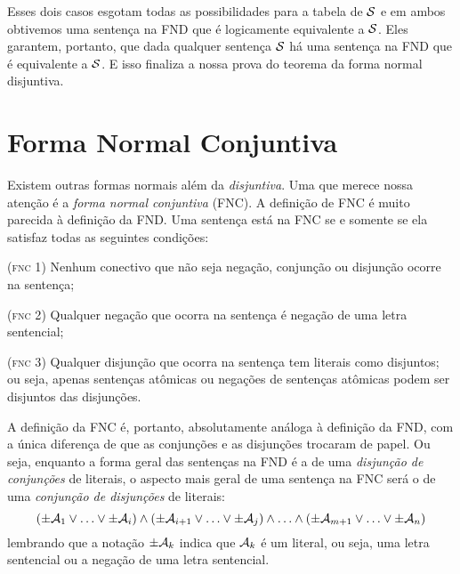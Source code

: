 	Esses dois casos esgotam todas as possibilidades para a tabela de $\mathcal{S}$ e em ambos obtivemos uma sentença na FND que é logicamente equivalente a $\mathcal{S}$.
	Eles garantem, portanto, que dada qualquer sentença $\mathcal{S}$ há uma sentença na FND que é equivalente a $\mathcal{S}$. E isso finaliza a nossa prova do teorema da forma normal disjuntiva.




\section{Forma Normal Conjuntiva}
\label{s:CNF}

Existem outras formas normais além da \emph{disjuntiva}.
Uma que merece nossa atenção é a \emph{forma normal conjuntiva} (FNC).
A definição de FNC é muito parecida à definição da FND.
Uma sentença está na FNC se e somente se ela satisfaz todas as seguintes condições:
	\begin{earg}
		\item[(\textsc{fnc 1})] Nenhum conectivo que não seja negação, conjunção ou disjunção ocorre na sentença;
		\item[(\textsc{fnc 2})] Qualquer negação que ocorra na sentença é negação de uma letra sentencial;
		\item[(\textsc{fnc 3})] Qualquer disjunção que ocorra na sentença tem literais como disjuntos; ou seja, apenas sentenças atômicas ou negações de sentenças atômicas podem ser disjuntos das disjunções.
	\end{earg}

\noindent A definição da FNC é, portanto, absolutamente análoga à definição da FND, com a única diferença de que as conjunções e as disjunções trocaram de papel.
Ou seja, enquanto a forma geral das sentenças na FND é a de uma \textit{disjunção de conjunções} de literais, o aspecto mais geral de uma sentença na FNC será o de uma \textit{conjunção de disjunções} de literais:
$$(\pm \mathcal{A}_1 \lor \ldots \lor \pm \mathcal{A}_i) \land (\pm \mathcal{A}_{i+1} \lor \ldots \lor \pm\mathcal{A}_j) \land \ldots \land (\pm\mathcal{A}_{m+1} \lor\ldots \lor \pm \mathcal{A}_n)$$
lembrando que a notação $\pm\mathcal{A}_k$ indica que $\mathcal{A}_k$ é um literal, ou seja, uma letra sentencial ou a negação de uma letra sentencial.

